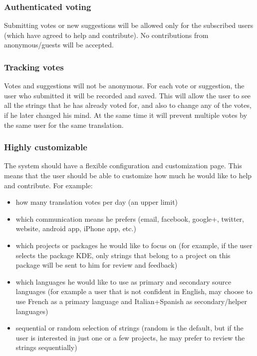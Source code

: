 \documentclass[11pt]{article}
\begin{document}
\subsubsection{Authenticated voting}
\label{sec-3.1.2}


    Submitting votes or new suggestions will be allowed only for the
    subscribed users (which have agreed to help and contribute). No
    contributions from anonymous/guests will be accepted.

\subsubsection{Tracking votes}
\label{sec-3.1.3}


    Votes and suggestions will not be anonymous. For each vote or
    suggestion, the user who submitted it will be recorded and
    saved. This will allow the user to see all the strings that he has
    already voted for, and also to change any of the votes, if he
    later changed his mind. At the same time it will prevent multiple
    votes by the same user for the same translation.

\subsubsection{Highly customizable}
\label{sec-3.1.4}


    The system should have a flexible configuration and customization
    page. This means that the user should be able to customize how much
    he would like to help and contribute. For example:
\begin{itemize}
\item how many translation votes per day (an upper limit)
\item which communication means he prefers (email, facebook,
       google+, twitter, website, android app, iPhone app, etc.)
\item which projects or packages he would like to focus on (for
       example, if the user selects the package KDE, only strings that
       belong to a project on this package will be sent to him for
       review and feedback)
\item which languages he would like to use as primary and secondary
       source languages (for example a user that is not confident in
       English, may choose to use French as a primary language and
       Italian+Spanish as secondary/helper languages)
\item sequential or random selection of strings (random is the
       default, but if the user is interested in just one or a few
       projects, he may prefer to review the strings sequentially)
\end{itemize}
\end{document}
